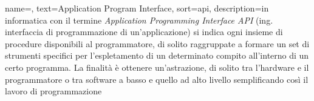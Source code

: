 
\renewcommand{\acronymname}{Acronimi e abbreviazioni}

\renewcommand{\glossaryname}{Glossario}

{
    name=,
    text=Application Program Interface,
    sort=api,
    description={in informatica con il termine \emph{Application Programming Interface API} (ing. interfaccia di programmazione di un'applicazione) si indica ogni insieme di procedure disponibili al programmatore, di solito raggruppate a formare un set di strumenti specifici per l'espletamento di un determinato compito all'interno di un certo programma. La finalità è ottenere un'astrazione, di solito tra l'hardware e il programmatore o tra software a basso e quello ad alto livello semplificando così il lavoro di programmazione}
}

